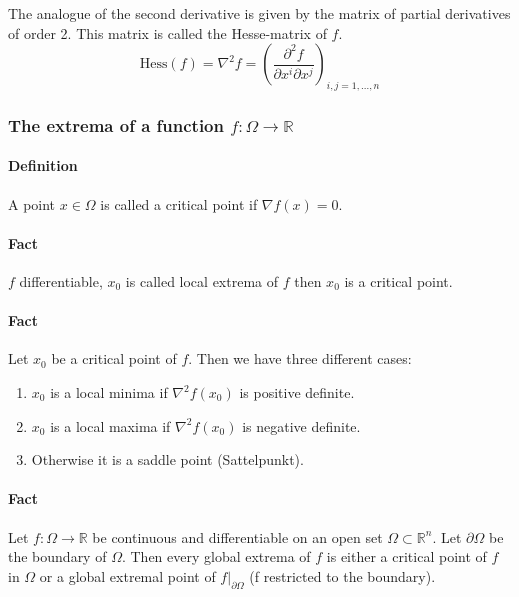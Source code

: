 \documentclass[11pt,a4paper]{book}
\begin{document}
The analogue of the second derivative is given by the matrix of partial derivatives of order 2. This matrix is called the Hesse-matrix of $f$.
$$\mbox{Hess}(f)=\nabla^2 f=\left(\frac{\partial^2 f}{\partial x^i \partial x^j}\right)_{i,j=1,...,n}$$

\subsubsection{The extrema of a function $f:\Omega \rightarrow \mathbb{R}$}
\paragraph*{Definition} A point $x \in \Omega$ is called a critical point if $\nabla f(x)=0$.
\paragraph*{Fact} $f$ differentiable, $x_0$ is called local extrema of $f$ then $x_0$ is a critical point.
\paragraph*{Fact} Let $x_0$ be a critical point of $f$. Then we have three different cases:
\begin{enumerate}
\item $x_0$ is a local minima if $\nabla^2 f(x_0)$ is positive definite.
\item $x_0$ is a local maxima if $\nabla^2 f(x_0)$ is negative definite.
\item Otherwise it is a saddle point (Sattelpunkt).
\end{enumerate}
\paragraph*{Fact} Let $f:\Omega \rightarrow \mathbb{R}$ be continuous and differentiable on an open set $\Omega \subset \mathbb{R}^n$. Let $\partial \Omega$ be the boundary of $\Omega$. Then every global extrema of $f$ is either a critical point of $f$ in $\Omega$ or a global extremal point of $f|_{\partial \Omega}$ (f restricted to the boundary).
\end{document}
